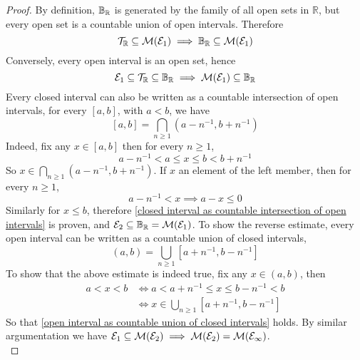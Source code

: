 \documentclass[../../main.tex]{subfiles}
\begin{document}
\begin{proof}
    By definition, $\borel$ is generated by the family of all open sets in $\mathbb{R}$, but every open set is a countable union of open intervals. Therefore
    \[
    \Tau_\mathbb{R}\subseteq \cal{M}(\cal{E}_1) \implies \borel\subseteq\cal{M}(\cal{E}_1)
    \]
    Conversely, every open interval is an open set, hence
    \[
    \cal{E}_1\subseteq \Tau_\mathbb{R}\subseteq\borel\implies\cal{M}(\cal{E}_1)\subseteq\borel
    \]
    Every closed interval can also be written as a countable intersection of open intervals, for every $[a,b]$, with $a<b$, we have
    \begin{equation}\label{closed interval as countable intersection of open intervals}
    [a,b] = \bigcap_{n\geq 1}(a-n^{-1},b+n^{-1})
    \end{equation}
    Indeed, fix any $x\in[a,b]$ then for every $n\geq 1$, 
    \[
    a-n^{-1}<a\leq x\leq b<b+n^{-1}
    \]
    So $x\in \bigcap_{n\geq 1} (a-n^{-1},b+n^{-1})$. If $x$ an element of the left member, then for every $n\geq 1$,
    \[
    a-n^{-1}<x\implies a-x\leq 0
    \]
    Similarly for $x\leq b$, therefore \eqref{closed interval as countable intersection of open intervals} is proven, and $\cal{E}_2\subseteq \borel=\cal{M}(\cal{E}_1)$. To show the reverse estimate, every open interval can be written as a countable union of closed intervals,
    \begin{equation}\label{open interval as countable union of closed intervals}
    (a,b)=\bigcup_{n\geq 1}[a+n^{-1},b-n^{-1}]
    \end{equation}
    To show that the above estimate is indeed true, fix any $x\in(a,b)$, then
    \begin{align*}
        a<x<b&\iff a<a+n^{-1}\leq x\leq b-n^{-1}<b\\
        &\iff x\in\bigcup_{n\geq 1}[a+n^{-1},b-n^{-1}]
    \end{align*}
    So that \eqref{open interval as countable union of closed intervals} holds. By similar argumentation we have $\cal{E}_1\subseteq\cal{M}(\cal{E}_2)\implies\cal{M}(\cal{E}_2)=\cal{M}(\cal{E_1})$.\\
    

\end{proof}
\end{document}

